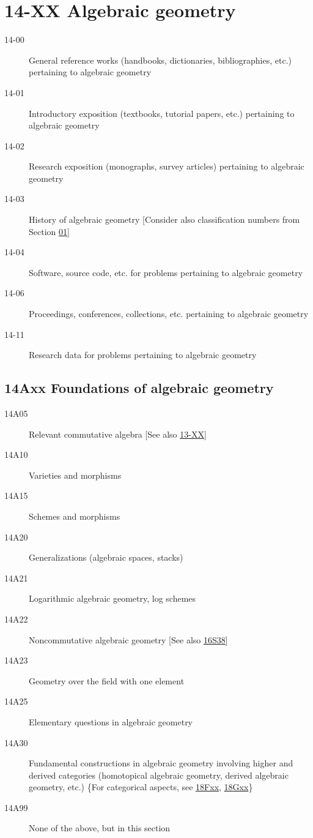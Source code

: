 \section*{14-XX Algebraic geometry }\label{14-XX}
\begin{description}          
\item [14-00]\label{14-00} General reference works (handbooks, dictionaries, bibliographies, etc.) pertaining to algebraic geometry
\item [14-01]\label{14-01} Introductory exposition (textbooks, tutorial papers, etc.) pertaining to algebraic geometry
\item [14-02]\label{14-02} Research exposition (monographs, survey articles) pertaining to algebraic geometry
\item [14-03]\label{14-03} History of algebraic geometry [Consider also classification numbers from Section \hyperref[01-XX]{01}]
\item [14-04]\label{14-04} Software, source code, etc. for problems pertaining to algebraic geometry
\item [14-06]\label{14-06} Proceedings, conferences, collections, etc. pertaining to algebraic geometry
\item [14-11]\label{14-11} Research data for problems pertaining to algebraic geometry
\end{description}          
\subsection*{14Axx Foundations of algebraic geometry }\label{14Axx}
\begin{description}               
\item [14A05]\label{14A05} Relevant commutative algebra [See also \hyperref[13-XX]{13-XX}]
\item [14A10]\label{14A10} Varieties and morphisms
\item [14A15]\label{14A15} Schemes and morphisms
\item [14A20]\label{14A20} Generalizations (algebraic spaces, stacks)
\item [14A21]\label{14A21} Logarithmic algebraic geometry, log schemes
\item [14A22]\label{14A22} Noncommutative algebraic geometry [See also \hyperref[16S38]{16S38}]
\item [14A23]\label{14A23} Geometry over the field with one element
\item [14A25]\label{14A25} Elementary questions in algebraic geometry
\item [14A30]\label{14A30} Fundamental constructions in algebraic geometry involving higher and derived categories (homotopical algebraic geometry, derived algebraic geometry, etc.) \{For categorical aspects, see \hyperref[18Fxx]{18Fxx}, \hyperref[18Gxx]{18Gxx}\}
\item [14A99]\label{14A99} None of the above, but in this section
\end{description}          
